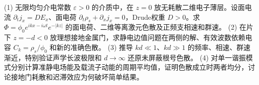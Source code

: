 (1) 无限均匀介电常数 \(\varepsilon>0\) 的介质中，在 \(z=0\) 放无耗散二维电子薄层。设面电流 \(\partial_t j_x=D E_x\)、面电荷 \(\partial_t\rho_s+\partial_xj_x=0\)，Drude权重 \(D>0\)。求 \(\Phi=\phi_0e^{ikx-i\omega t}e^{-|kz|}\) 的面电荷、二维等离激元色散及正频支相速和群速。
(2) 在片下 \(z=-d<0\) 放理想接地金属门，求静电边值问题在两侧的解、有效波数依赖电容 \(C_k=\rho_s/\phi_0\) 和新的准确色散。
(3) 推导 \(kd\ll1\)、\(kd\gg1\) 的频率、相速、群速渐近，特别验证声学长波极限和 \(d\to\infty\) 还原未屏蔽根号色散。
(4) 对单一谐振模式分别计算准静电场能及载流子动能的周期平均值，证明色散成立时两者均分，讨论接地门耗散和迟滞效应为何破坏简单结果。
